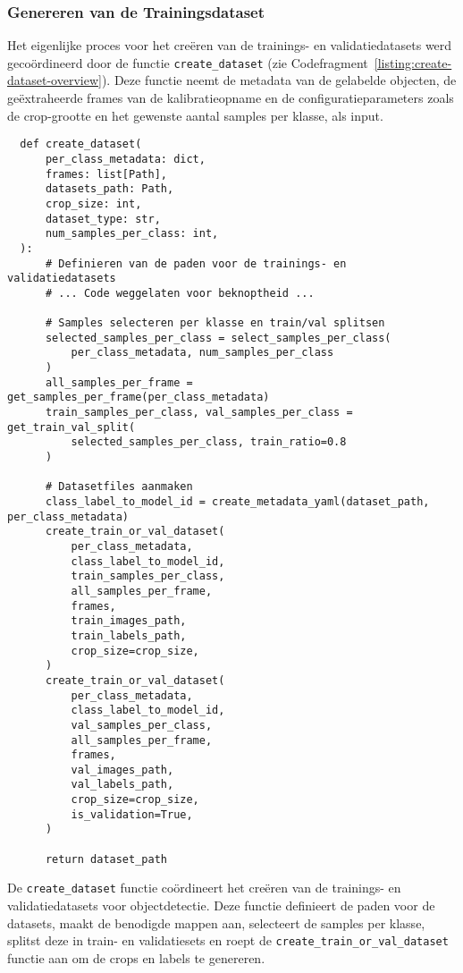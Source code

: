 \subsubsection{Genereren van de Trainingsdataset}

Het eigenlijke proces voor het creëren van de trainings- en validatiedatasets werd gecoördineerd door de functie \texttt{create\_dataset} 
(zie Codefragment~\ref{listing:create-dataset-overview}). 
Deze functie neemt de metadata van de gelabelde objecten, de geëxtraheerde frames van de kalibratieopname 
en de configuratieparameters zoals de crop-grootte en het gewenste aantal samples per klasse, als input.

\begin{listing}[H]
  \fontsize{10pt}{9.6pt}
  \begin{verbatim}
  def create_dataset(
      per_class_metadata: dict,
      frames: list[Path],
      datasets_path: Path,
      crop_size: int,
      dataset_type: str,
      num_samples_per_class: int,
  ):
      # Definieren van de paden voor de trainings- en validatiedatasets
      # ... Code weggelaten voor beknoptheid ...

      # Samples selecteren per klasse en train/val splitsen
      selected_samples_per_class = select_samples_per_class(
          per_class_metadata, num_samples_per_class
      )
      all_samples_per_frame = get_samples_per_frame(per_class_metadata)
      train_samples_per_class, val_samples_per_class = get_train_val_split(
          selected_samples_per_class, train_ratio=0.8
      )

      # Datasetfiles aanmaken
      class_label_to_model_id = create_metadata_yaml(dataset_path, per_class_metadata)
      create_train_or_val_dataset(
          per_class_metadata,
          class_label_to_model_id,
          train_samples_per_class,
          all_samples_per_frame,
          frames,
          train_images_path,
          train_labels_path,
          crop_size=crop_size,
      )
      create_train_or_val_dataset(
          per_class_metadata,
          class_label_to_model_id,
          val_samples_per_class,
          all_samples_per_frame,
          frames,
          val_images_path,
          val_labels_path,
          crop_size=crop_size,
          is_validation=True,
      )

      return dataset_path
  \end{verbatim}
  \caption[Functie voor het creëren van de objectdetectie-trainingsdataset]{
    \label{listing:create-dataset-overview}
    De \texttt{create\_dataset} functie coördineert het creëren van de trainings- en validatiedatasets voor objectdetectie.
    Deze functie definieert de paden voor de datasets, maakt de benodigde mappen aan,
    selecteert de samples per klasse, splitst deze in train- en validatiesets
    en roept de \texttt{create\_train\_or\_val\_dataset} functie aan om de crops en labels te genereren. 
  }
\end{listing}

